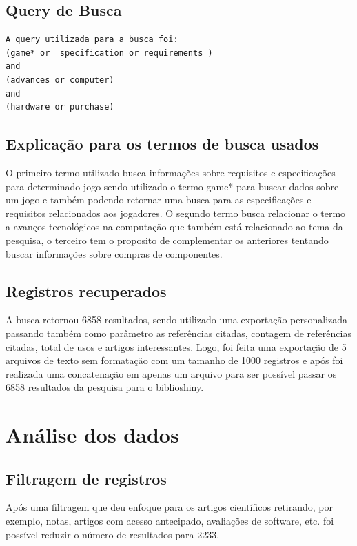 \subsection{Query de Busca}
\begin{verbatim}
A query utilizada para a busca foi:
(game* or  specification or requirements ) 
and 
(advances or computer) 
and 
(hardware or purchase)
\end{verbatim}

\subsection{Explicação para os termos de busca usados}

O primeiro termo utilizado busca informações sobre requisitos e especificações para determinado jogo sendo utilizado o termo game* para buscar dados sobre um jogo e também podendo retornar uma busca para as especificações e requisitos relacionados aos jogadores. O segundo termo busca relacionar o termo a avanços tecnológicos na computação que também está relacionado ao tema da pesquisa, o terceiro tem o proposito de complementar os anteriores tentando buscar informações sobre compras de componentes.

\subsection{Registros recuperados}

A busca retornou 6858 resultados, sendo utilizado uma exportação personalizada passando também como parâmetro as referências citadas, contagem de referências citadas, total de usos e artigos interessantes. Logo, foi feita uma exportação de 5 arquivos de texto sem formatação com um tamanho de 1000 registros e após foi realizada uma concatenação em apenas um arquivo para ser possível passar os 6858 resultados da pesquisa para o biblioshiny.

\section{Análise dos dados}

\subsection{Filtragem de registros}
Após uma filtragem que deu enfoque para os artigos científicos retirando, por exemplo, notas, artigos com acesso antecipado, avaliações de software, etc. foi possível reduzir o número de resultados para 2233.

